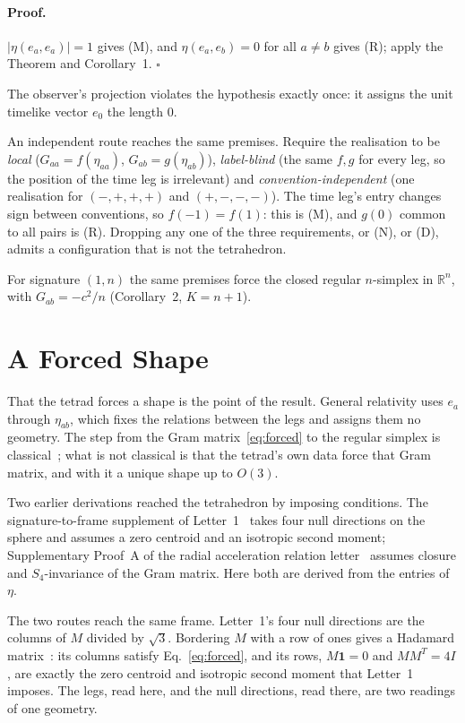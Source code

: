 \documentclass[twocolumn]{iopjournal}
\begin{document}
\paragraph{Proof.} $|\eta(e_a,e_a)| = 1$ gives (M), and
$\eta(e_a,e_b) = 0$ for all $a \neq b$ gives (R); apply the Theorem
and Corollary~1. \hfill $\square$

\noindent
The observer's projection violates the hypothesis exactly once: it
assigns the unit timelike vector $e_0$ the length $0$.

An independent route reaches the same premises. Require the
realisation to be \emph{local} ($G_{aa} = f(\eta_{aa})$,
$G_{ab} = g(\eta_{ab})$), \emph{label-blind} (the same $f, g$ for
every leg, so the position of the time leg is irrelevant) and
\emph{convention-independent} (one realisation for $(-,+,+,+)$ and
$(+,-,-,-)$). The time leg's entry changes sign between conventions,
so $f(-1) = f(1)$: this is (M), and $g(0)$ common to all pairs is
(R). Dropping any one of the three requirements, or (N), or (D),
admits a configuration that is not the tetrahedron.

For signature $(1,n)$ the same premises force the closed regular
$n$-simplex in $\mathbb{R}^n$, with $G_{ab} = -c^2/n$
(Corollary~2, $K = n+1$).


\section*{A Forced Shape}

That the tetrad forces a shape is the point of the result. General
relativity uses $e_a$ through $\eta_{ab}$, which fixes the relations
between the legs and assigns them no geometry. The step from the
Gram matrix~\eqref{eq:forced} to the regular simplex is
classical~\cite{Coxeter1973}; what is not classical is that the
tetrad's own data force that Gram matrix, and with it a unique shape
up to $O(3)$.

Two earlier derivations reached the tetrahedron by imposing
conditions. The signature-to-frame supplement of
Letter~1~\cite{NelsonL1} takes four null directions on the sphere and
assumes a zero centroid and an isotropic second moment; Supplementary
Proof~A of the radial acceleration relation letter~\cite{NelsonRAR}
assumes closure and $S_4$-invariance of the Gram matrix. Here both
are derived from the entries of $\eta$.

The two routes reach the same frame. Letter~1's four null directions
are the columns of $M$ divided by $\sqrt3$. Bordering $M$ with a row
of ones gives a Hadamard matrix~\cite{NelsonHad}: its columns satisfy
Eq.~\eqref{eq:forced}, and its rows, $M\mathbf{1} = 0$ and
$MM^T = 4I$, are exactly the zero centroid and isotropic second
moment that Letter~1 imposes. The legs, read here, and the null
directions, read there, are two readings of one geometry.
\end{document}

